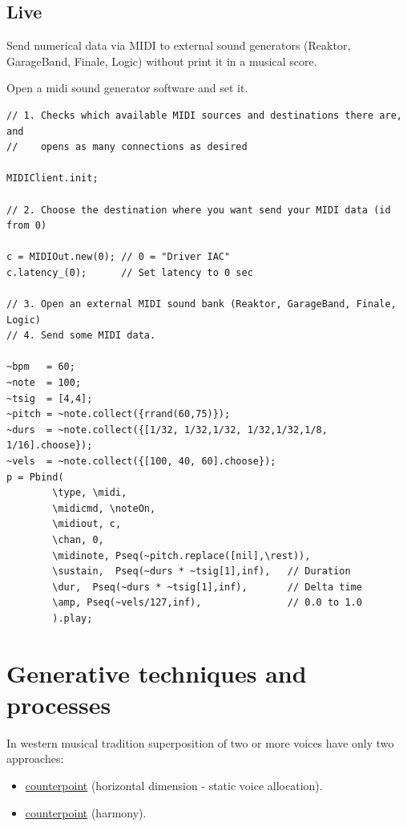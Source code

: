 \subsection{Live}\label{live}

Send numerical data via MIDI to external sound generators (Reaktor, GarageBand, Finale, Logic) without print it in a musical score.

Open a midi sound generator software and set it.

\begin{lstlisting}[frame=single, caption=Live midi out sender model] 
// 1. Checks which available MIDI sources and destinations there are, and
//    opens as many connections as desired

MIDIClient.init;

// 2. Choose the destination where you want send your MIDI data (id from 0)

c = MIDIOut.new(0); // 0 = "Driver IAC"
c.latency_(0);      // Set latency to 0 sec

// 3. Open an external MIDI sound bank (Reaktor, GarageBand, Finale, Logic)
// 4. Send some MIDI data.

~bpm   = 60;  
~note  = 100;     
~tsig  = [4,4];
~pitch = ~note.collect({rrand(60,75)});
~durs  = ~note.collect({[1/32, 1/32,1/32, 1/32,1/32,1/8, 1/16].choose});
~vels  = ~note.collect({[100, 40, 60].choose});
p = Pbind(
        \type, \midi,
        \midicmd, \noteOn,
        \midiout, c,
        \chan, 0,
        \midinote, Pseq(~pitch.replace([nil],\rest)),
        \sustain,  Pseq(~durs * ~tsig[1],inf),   // Duration
        \dur,  Pseq(~durs * ~tsig[1],inf),       // Delta time
        \amp, Pseq(~vels/127,inf),               // 0.0 to 1.0
        ).play;
\end{lstlisting}

\section{Generative techniques and processes}\label{generative-techniques-and-processes}

In western musical tradition superposition of two or more voices have only two approaches: 

\begin{itemize}
\tightlist
\item \href{http://www.musicaecodice.it/gitmedia/emc/5_media/palestrina1.mp4}{counterpoint} (horizontal dimension - static voice allocation).
\item \href{http://www.musicaecodice.it/gitmedia/emc/5_media/beetho1.mp4}{counterpoint} (harmony).
\end{itemize}

